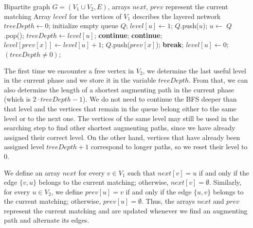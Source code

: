 \documentclass[12pt]{report}
\numberwithin{algorithm}{chapter}
\begin{document}
	\begin{algorithm}[H]
	\caption{BFS Layered Network Construction}
	\label{layeredNetwork}
	\begin{algorithmic}[1]
	\Require Bipartite graph $G=(V_1 \cup V_2,E)$, arrays $\mathit{next}$, $\mathit{prev}$ represent the current matching
	\Ensure Array $\mathit{level}$ for the vertices of $V_{1}$ describes the layered network
		\State $\mathit{treeDepth} \gets 0$;
		\State initialize empty queue $Q$;
				\State $\mathit{level}[u] \gets 1$;
				\State $Q$.push($u$);
			\EndIf
		\EndFor
			\State $u \gets$ $Q$.pop();
					\State $\mathit{treeDepth} \gets \mathit{level}[u]$;
					\State \textbf{continue};
				\EndIf
					\State \textbf{continue};
				\EndIf
					\State $\mathit{level}[\mathit{prev}[x]] \gets \mathit{level}[u] + 1$;
					\State $Q$.push($\mathit{prev}[x]$);
				\EndIf
			\EndFor
				\State \textbf{break};
			\EndIf
		\EndWhile
				\State $\mathit{level}[u] \gets 0$;
			\EndIf
		\EndFor
		\State \Return $(\mathit{treeDepth} \neq 0)$;
	\EndFunction
	\end{algorithmic}
	\end{algorithm}

	The first time we encounter a free vertex in $V_{2}$, we determine the last useful level in the current phase and we store it in the variable $\mathit{treeDepth}$. From that, we can also determine the length of a shortest augmenting path in the current phase (which is $2\cdot \mathit{treeDepth} - 1$). We do not need to continue the BFS deeper than that level and the vertices that remain in the queue belong either to the same level or to the next one. The vertices of the same level may still be used in the searching step to find other shortest augmenting paths, since we have already assigned their correct level. On the other hand, vertices that have already been assigned level $\mathit{treeDepth} + 1$ correspond to longer paths, so we reset their level to $0$. 

	We define an array $\mathit{next}$ for every $v \in V_{1}$ such that $\mathit{next}[v] = u$ if and only if the edge $\{v,u\}$ belongs to the current matching; otherwise, $\mathit{next}[v] = \emptyset$. Similarly, for every $u \in V_{2}$, we define $\mathit{prev}[u] = v$ if and only if the edge $\{u,v\}$ belongs to the current matching; otherwise, $\mathit{prev}[u] = \emptyset$. Thus, the arrays $\mathit{next}$ and $\mathit{prev}$ represent the current matching and are updated whenever we find an augmenting path and alternate its edges.
\end{document}
